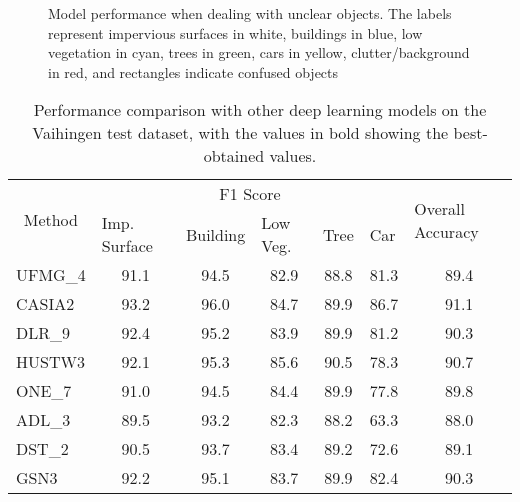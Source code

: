 \documentclass[journal]{IEEEtran}
\begin{document}
\begin{figure}[hptb]
\caption{Model performance when dealing with unclear objects. The labels represent impervious surfaces in white, buildings in blue, low vegetation in cyan, trees in green, cars in yellow, clutter/background in red, and rectangles indicate confused objects}
\label{fig: 9}
\end{figure}

\begin{table*}[h!]
\renewcommand{\arraystretch}{1.25}
\centering
\caption{Performance comparison with other deep learning models on the Vaihingen test dataset, with the values in bold showing the best-obtained values.}
\begin{tabular}{lcccccc} 
\hline
\multicolumn{1}{c}{\multirow{2}{*}{Method}} & \multicolumn{5}{c}{F1 Score}  & \multicolumn{1}{l}{\multirow{2}{*}{Overall Accuracy}} \\ 
\cline{2-6}
\multicolumn{1}{c}{}  & \multicolumn{1}{l}{Imp. Surface} & \multicolumn{1}{l}{Building} & \multicolumn{1}{l}{Low Veg.} & \multicolumn{1}{l}{Tree} & \multicolumn{1}{l}{Car} & \multicolumn{1}{l}{}                                     \\ 
\hline
UFMG\_4 \cite{7725499} 
                        & 91.1  & 94.5    & 82.9   & 88.8    & 81.3  & 89.4        \\
CASIA2 \cite{LIU201878}          
                        & 93.2  & 96.0    & 84.7   & 89.9    & 86.7  & 91.1         \\
DLR\_9 \cite{MARMANIS2018158}    
                       & 92.4  & 95.2    & 83.9   & 89.9    & 81.2  & 90.3          \\
HUSTW3 \cite{SUN2019297}                                 
                      & 92.1   & 95.3    & 85.6   & 90.5    & 78.3  & 90.7          \\
ONE\_7 \cite{AUDEBERT201820}
                      & 91.0   & 94.5    & 84.4   & 89.9    & 77.8  & 89.8          \\
ADL\_3 \cite{Peng_2017_CVPR}                                 
                     & 89.5    & 93.2    & 82.3   & 88.2   & 63.3   & 88.0           \\
DST\_2 \cite{7301381}                                
                     & 90.5    & 93.7                         & 83.4                           & 89.2                     & 72.6                    & 89.1                                                     \\
GSN3 \cite{https://doi.org/10.48550/arxiv.1606.02585}                                   & 92.2                               & 95.1                         & 83.7                           & 89.9                     & 82.4                    & 90.3                                                     \\

\end{tabular}
\end{table*}
\end{document}
